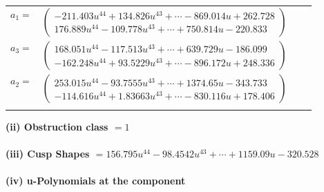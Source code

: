 \documentclass[1p]{elsarticle_modified}
\theoremstyle{definition}
\begin{document}
\begin{tabular}{m{7pt} m{180pt} m{7pt} m{180pt} }
\flushright $a_{1}=$&$\begin{pmatrix}-211.403 u^{44}+134.826 u^{43}+\cdots-869.014 u+262.728\\176.889 u^{44}-109.778 u^{43}+\cdots+750.814 u-220.833\end{pmatrix}$ \\
\flushright $a_{3}=$&$\begin{pmatrix}168.051 u^{44}-117.513 u^{43}+\cdots+639.729 u-186.099\\-162.248 u^{44}+93.5229 u^{43}+\cdots-896.172 u+248.336\end{pmatrix}$ \\
\flushright $a_{2}=$&$\begin{pmatrix}253.015 u^{44}-93.7555 u^{43}+\cdots+1374.65 u-343.733\\-114.616 u^{44}+1.83663 u^{43}+\cdots-830.116 u+178.406\end{pmatrix}$\\&\end{tabular}
\flushleft \textbf{(ii) Obstruction class $= 1$}\\~\\
\flushleft \textbf{(iii) Cusp Shapes $= 156.795 u^{44}-98.4542 u^{43}+\cdots+1159.09 u-320.528$}\\~\\
\newpage\renewcommand{\arraystretch}{1}
\flushleft \textbf{(iv) u-Polynomials at the component}\newline \\
\end{document}

